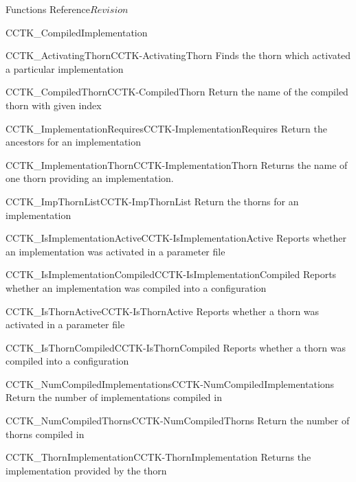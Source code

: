 \begin{cactuspart}{ Functions Reference}{}{$Revision$}
\begin{FunctionDescription}{CCTK\_CompiledImplementation}
\begin{SeeAlsoSection}
\begin{SeeAlso2}{CCTK\_ActivatingThorn}{CCTK-ActivatingThorn}
  Finds the thorn which activated a particular implementation
\end{SeeAlso2}
\begin{SeeAlso2}{CCTK\_CompiledThorn}{CCTK-CompiledThorn}
  Return the name of the compiled thorn with given index
\end{SeeAlso2}
\begin{SeeAlso2}{CCTK\_ImplementationRequires}{CCTK-ImplementationRequires}
  Return the ancestors for an implementation
\end{SeeAlso2}
\begin{SeeAlso2}{CCTK\_ImplementationThorn}{CCTK-ImplementationThorn}
  Returns the name of one thorn providing an implementation.
\end{SeeAlso2}
\begin{SeeAlso2}{CCTK\_ImpThornList}{CCTK-ImpThornList}
  Return the thorns for an implementation
\end{SeeAlso2}
\begin{SeeAlso2}{CCTK\_IsImplementationActive}{CCTK-IsImplementationActive}
  Reports whether an implementation was activated in a parameter file
\end{SeeAlso2}
\begin{SeeAlso2}{CCTK\_IsImplementationCompiled}{CCTK-IsImplementationCompiled}
  Reports whether an implementation was compiled into a configuration
\end{SeeAlso2}
\begin{SeeAlso2}{CCTK\_IsThornActive}{CCTK-IsThornActive}
  Reports whether a thorn was activated in a parameter file
\end{SeeAlso2}
\begin{SeeAlso2}{CCTK\_IsThornCompiled}{CCTK-IsThornCompiled}
  Reports whether a thorn was compiled into a configuration
\end{SeeAlso2}
\begin{SeeAlso2}{CCTK\_NumCompiledImplementations}{CCTK-NumCompiledImplementations}
  Return the number of implementations compiled in
\end{SeeAlso2}
\begin{SeeAlso2}{CCTK\_NumCompiledThorns}{CCTK-NumCompiledThorns}
  Return the number of thorns compiled in
\end{SeeAlso2}
\begin{SeeAlso2}{CCTK\_ThornImplementation}{CCTK-ThornImplementation}
  Returns the implementation provided by the thorn
\end{SeeAlso2}
\end{SeeAlsoSection}


\end{FunctionDescription}
\end{cactuspart}

